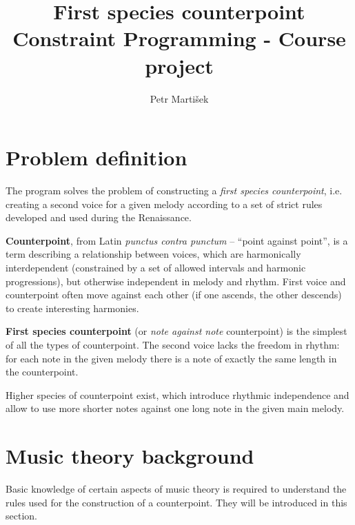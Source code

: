 \documentclass[11pt]{article} %
\title{\textbf{First species counterpoint}\\Constraint Programming - Course project}
\author{Petr Martišek}
\date{} %
\begin{document}
\maketitle
\setlength{\parskip}{5pt}
\section{Problem definition}
The program solves the problem of constructing a \emph{first species counterpoint}, i.e. creating a second voice for a given melody according to a set of strict rules developed and used during the Renaissance.

\textbf{Counterpoint}, from Latin \emph{punctus contra punctum} -- “point against point”, is a term describing a relationship between voices, which are harmonically interdependent (constrained by a set of allowed intervals and harmonic progressions), but otherwise independent in melody and rhythm. First voice and counterpoint often move against each other (if one ascends, the other descends) to create interesting harmonies. 

\textbf{First species counterpoint} (or \emph{note against note} counterpoint) is the simplest of all the types of counterpoint. The second voice lacks the freedom in rhythm: for each note in the given melody there is a note of exactly the same length in the counterpoint.

Higher species of counterpoint exist, which introduce rhythmic independence and allow to use more shorter notes against one long note in the given main melody.
\section{Music theory background}
Basic knowledge of certain aspects of music theory is required to understand the rules used for the construction of a counterpoint. They will be introduced in this section.
\end{document}
